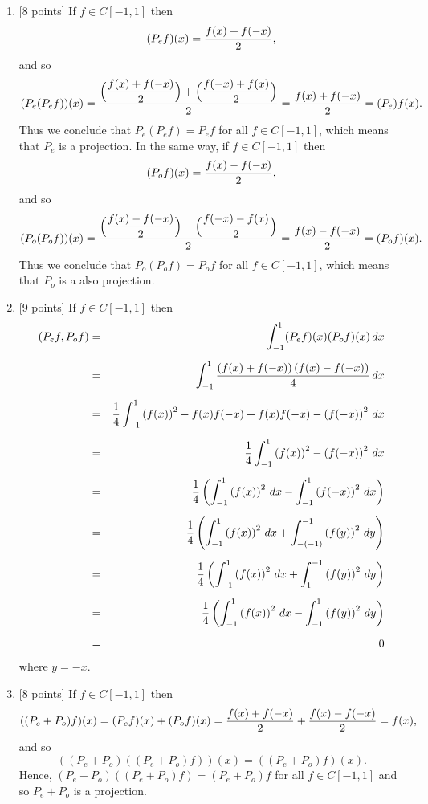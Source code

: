 \begin{solution}
\begin{enumerate}
\item {[8 points]} If $f\in C[-1,1]$ then
     \[ (P_e f)(x) = {f(x)+f(-x) \over 2},\]
     and so
     \[ (P_e(P_e f))(x) = {\Big(\displaystyle{f(x)+f(-x)\over 2}\Big) + \Big({f(-x)+f(x)\over 2}\Big) \over 2}
                   = {f(x)+f(-x) \over 2} = (P_e) f(x).\]
     Thus we conclude that $P_e(P_e f) = P_e f$ for all $f\in C[-1,1]$, which means that $P_e$ is a projection. In the same way, if $f\in C[-1,1]$ then
     \[ (P_o f)(x) = {f(x)-f(-x) \over 2},\]
     and so
     \[ (P_o(P_o f))(x) = {\Big(\displaystyle{f(x)-f(-x)\over 2}\Big) - \Big({f(-x)-f(x)\over 2}\Big) \over 2}
                   = {f(x)-f(-x) \over 2} = (P_o f)(x).\]
     Thus we conclude that $P_o(P_o f) = P_o f$ for all $f\in C[-1,1]$, which means that $P_o$ is a also projection.

\item {[9 points]} If $f\in C[-1,1]$ then
     \begin{eqnarray*}
   (P_e f, P_o f) &=& \int_{-1}^1 (P_e f)(x) (P_o f)(x)\, d x \\[.5em]
                       &=& \int_{-1}^1 {\left(f(x)+f(-x)\right)\left(f(x)-f(-x)\right) \over 4}\, d x \\[.5em]
                       &=& {1\over 4} \int_{-1}^1 \left(f(x)\right)^2 - f(x) f(-x) + f(x) f(-x) - \left(f(-x)\right)^2  \, dx \\[.5em]
                       &=& {1\over 4} \int_{-1}^1 \left(f(x)\right)^2 - \left(f(-x)\right)^2  \, dx \\[.5em]
                       &=& {1\over 4} \left(\int_{-1}^1 \left(f(x)\right)^2 \, dx - \int_{-1}^1 \left(f(-x)\right)^2  \, dx\right) \\[.5em]
                       &=& {1\over 4} \left(\int_{-1}^1 \left(f(x)\right)^2 \, dx + \int_{-(-1)}^{-1} \left(f(y)\right)^2  \, dy\right) \\[.5em]
                       &=& {1\over 4} \left(\int_{-1}^1 \left(f(x)\right)^2 \, dx + \int_1^{-1} \left(f(y)\right)^2  \, dy\right) \\[.5em]
                       &=& {1\over 4} \left(\int_{-1}^1 \left(f(x)\right)^2 \, dx - \int_{-1}^1 \left(f(y)\right)^2  \, dy\right) \\[.5em]
                       &=& 0
     \end{eqnarray*}
where $y=-x$.

\item {[8 points]} If $f\in C[-1,1]$ then
\[
((P_e+P_o)f)(x)=(P_e f)(x) +(P_o f)(x) = {f(x) + f(-x) \over 2}+{f(x) - f(-x) \over 2} = f(x),
\]
and so
\[
((P_e+P_o)((P_e+P_o)f))(x)= ((P_e+P_o)f)(x).
\]
Hence, $(P_e+P_o)((P_e+P_o)f)=(P_e+P_o)f$ for all $f\in C[-1,1]$ and so $P_e + P_o$ is a projection.

\end{enumerate}
\end{solution}